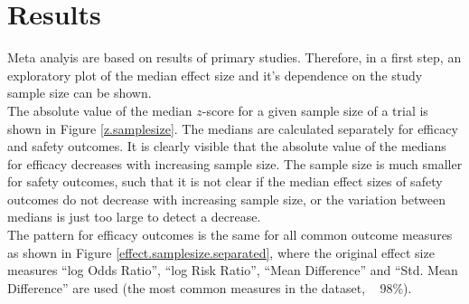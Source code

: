 \documentclass[11pt,a4paper,twoside]{book}\usepackage[]{graphicx}\usepackage[]{color}
\begin{document}

































\chapter{Results} \label{ch:Results}




Meta analyis are based on results of primary studies. Therefore, in a first step, an exploratory plot of the median effect size and it's dependence on the study sample size can be shown. \\
The absolute value of the median $z$-score for a given sample size of a trial is shown in Figure \ref{z.samplesize}. The medians are calculated separately for efficacy and safety outcomes. It is clearly visible that the absolute value of the medians for efficacy decreases with increasing sample size. The sample size is much smaller for safety outcomes, such that it is not clear if the median effect sizes of safety outcomes do not decrease with increasing sample size, or the variation between medians is just too large to detect a decrease.\\
The pattern for efficacy outcomes is the same for all common outcome measures as shown in Figure \ref{effect.samplesize.separated}, where the original effect size measures ``log Odds Ratio'', ``log Risk Ratio'', ``Mean Difference'' and ``Std. Mean Difference'' are used (the most common measures in the dataset, ~ 98\%). 
\end{document}
